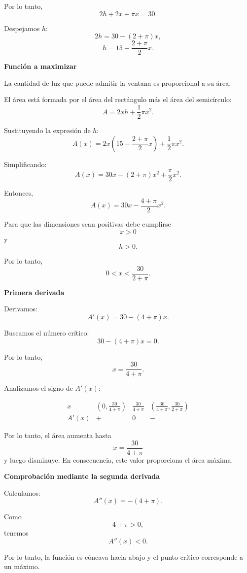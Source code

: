 \documentclass[12pt]{article}
\begin{document}
\begin{enumerate}[label=\alph*.-]
    Por lo tanto,
    \[
    2h+2x+\pi x=30.
    \]

    Despejamos $h$:
    \[
    2h=30-(2+\pi)x,
    \]
    \[
    h=15-\frac{2+\pi}{2}x.
    \]

    \textbf{Función a maximizar}

    La cantidad de luz que puede admitir la ventana es proporcional
    a su área.

    El área está formada por el área del rectángulo más el área del
    semicírculo:
    \[
    A=2xh+\frac12\pi x^2.
    \]

    Sustituyendo la expresión de $h$:
    \[
    A(x)
    =
    2x\left(15-\frac{2+\pi}{2}x\right)
    +\frac12\pi x^2.
    \]

    Simplificando:
    \[
    A(x)
    =
    30x-(2+\pi)x^2+\frac{\pi}{2}x^2.
    \]

    Entonces,
    \[
    \boxed{
    A(x)=30x-\frac{4+\pi}{2}x^2
    }.
    \]

    Para que las dimensiones sean positivas debe cumplirse
    \[
    x>0
    \]
    y
    \[
    h>0.
    \]

    Por lo tanto,
    \[
    0<x<\frac{30}{2+\pi}.
    \]

    \textbf{Primera derivada}

    Derivamos:
    \[
    A'(x)
    =
    30-(4+\pi)x.
    \]

    Buscamos el número crítico:
    \[
    30-(4+\pi)x=0.
    \]

    Por lo tanto,
    \[
    x=\frac{30}{4+\pi}.
    \]

    Analizamos el signo de $A'(x)$:

    \[
    \begin{array}{c|ccc}
    x &
    \left(0,\frac{30}{4+\pi}\right) &
    \frac{30}{4+\pi} &
    \left(\frac{30}{4+\pi},\frac{30}{2+\pi}\right)
    \\
    \hline
    A'(x) & + & 0 & -
    \end{array}
    \]

    Por lo tanto, el área aumenta hasta
    \[
    x=\frac{30}{4+\pi}
    \]
    y luego disminuye. En consecuencia, este valor proporciona el
    área máxima.

    \textbf{Comprobación mediante la segunda derivada}

    Calculamos:
    \[
    A''(x)=-(4+\pi).
    \]

    Como
    \[
    4+\pi>0,
    \]
    tenemos
    \[
    A''(x)<0.
    \]

    Por lo tanto, la función es cóncava hacia abajo y el punto crítico
    corresponde a un máximo.


\end{enumerate}
\end{document}

